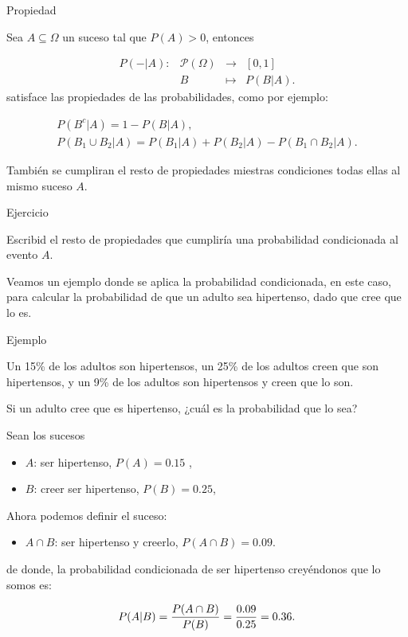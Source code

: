\documentclass[
  letterpaper,
  DIV=11,
  numbers=noendperiod]{scrreprt}
\providecommand{\tightlist}{%
  \setlength{\itemsep}{0pt}\setlength{\parskip}{0pt}}\usepackage{longtable,booktabs,array}
\begin{document}
Propiedad

Sea \(A\subseteq \Omega\) un suceso tal que \(P(A)>0\), entonces

\[
\begin{array}{rccl}
P(-|A):& \mathcal{P}(\Omega) & \to & [0,1]\\
&B & \mapsto & P(B|A).
\end{array}
\] satisface las propiedades de las probabilidades, como por ejemplo:

\[
\begin{array}{l}
P(B^c|A)=1-P(B|A),\\
P(B_1\cup B_2|A)=P(B_1|A)+P(B_2|A)-P(B_1\cap B_2|A).
\end{array}
\]

También se cumpliran el resto de propiedades miestras condiciones todas
ellas al mismo suceso \(A\).

Ejercicio

Escribid el resto de propiedades que cumpliría una probabilidad
condicionada al evento \(A\).

Veamos un ejemplo donde se aplica la probabilidad condicionada, en este
caso, para calcular la probabilidad de que un adulto sea hipertenso,
dado que cree que lo es.

Ejemplo

Un 15\% de los adultos son hipertensos, un 25\% de los adultos creen que
son hipertensos, y un 9\% de los adultos son hipertensos y creen que lo
son.

Si un adulto cree que es hipertenso, ¿cuál es la probabilidad que lo
sea?

Sean los sucesos

\begin{itemize}
\tightlist
\item
  \(A\): ser hipertenso, \(P(A)=0.15\) ,
\item
  \(B\): creer ser hipertenso, \(P(B)=0.25\),
\end{itemize}

Ahora podemos definir el suceso:

\begin{itemize}
\tightlist
\item
  \(A\cap B\): ser hipertenso y creerlo, \(P(A\cap B)=0.09\).
\end{itemize}

de donde, la probabilidad condicionada de ser hipertenso creyéndonos que
lo somos es:

\[\scriptsize P(A|B)=\dfrac{P(A\cap B)}{P(B)}=\dfrac{0.09}{0.25}=0.36.\]
\end{document}
